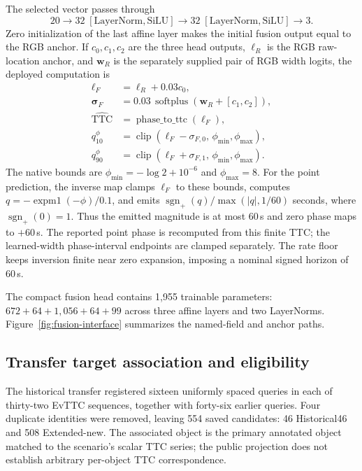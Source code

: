 The selected vector passes through
\begin{equation}
  20\rightarrow 32\;[\mathrm{LayerNorm},\mathrm{SiLU}]
  \rightarrow 32\;[\mathrm{LayerNorm},\mathrm{SiLU}]
  \rightarrow 3.
\end{equation}
Zero initialization of the last affine layer makes the initial fusion output equal to the RGB anchor. If \(c_0,c_1,c_2\) are the three head outputs, \(\ell_R\) is the RGB raw-location anchor, and \(\mathbf{w}_R\) is the separately supplied pair of RGB width logits, the deployed computation is
\begin{align}
  \ell_F &= \ell_R + 0.03c_0, \\
  \boldsymbol{\sigma}_F &= 0.03\,\operatorname{softplus}\!\left(\mathbf{w}_R+[c_1,c_2]\right), \\
  \widehat{\mathrm{TTC}} &= \operatorname{phase\_to\_ttc}(\ell_F), \\
  q_{10}^{\phi} &= \operatorname{clip}(\ell_F-\sigma_{F,0},\,\phi_{\min},\phi_{\max}), \\
  q_{90}^{\phi} &= \operatorname{clip}(\ell_F+\sigma_{F,1},\,\phi_{\min},\phi_{\max}).
\end{align}
The native bounds are \(\phi_{\min}=-\log 2+10^{-6}\) and \(\phi_{\max}=8\). For the point prediction, the inverse map clamps \(\ell_F\) to these bounds, computes \(q=-\operatorname{expm1}(-\phi)/0.1\), and emits \(\operatorname{sgn}_{+}(q)/\max(|q|,1/60)\) seconds, where \(\operatorname{sgn}_{+}(0)=1\). Thus the emitted magnitude is at most 60\,s and zero phase maps to \(+60\)\,s. The reported point phase is recomputed from this finite TTC; the learned-width phase-interval endpoints are clamped separately. The rate floor keeps inversion finite near zero expansion, imposing a nominal signed horizon of 60\,s. 

The compact fusion head contains 1,955 trainable parameters: \(672+64+1{,}056+64+99\) across three affine layers and two LayerNorms. Figure~\ref{fig:fusion-interface} summarizes the named-field and anchor paths. 




\subsection{Transfer target association and eligibility}\label{app:target-association}
The historical transfer registered sixteen uniformly spaced queries in each of thirty-two EvTTC sequences, together with forty-six earlier queries. Four duplicate identities were removed, leaving 554 saved candidates: 46 Historical46 and 508 Extended-new. The associated object is the primary annotated object matched to the scenario's scalar TTC series; the public projection does not establish arbitrary per-object TTC correspondence.

